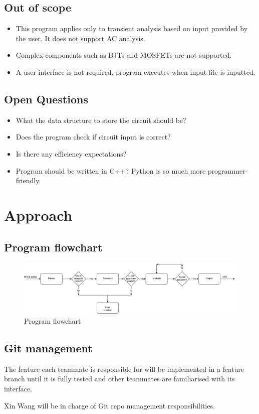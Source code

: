 \documentclass[a4paper, titlepage]{article}
\begin{document}
    \subsection{Out of scope}
    \begin{itemize}
        \item This program applies only to transient analysis based on input provided by the user.
        It does not support AC analysis.
        \item Complex components such as BJTs and MOSFETs are not supported.
        \item A user interface is not required, program executes when input file is inputted.
    \end{itemize}
    \subsection{Open Questions}
    \begin{itemize}
        \item What the data structure to store the circuit should be?
        \item Does the program check if circuit input is correct?
        \item Is there any efficiency expectations?
        \item Program should be written in C++? Python is so much more programmer-friendly.
    \end{itemize}

    \section{Approach}
    \subsection{Program flowchart}
    \begin{figure}[h]
        \centering
        \includegraphics[width = \textwidth]{Program flow}
        \caption{Program flowchart}
        \label{fig:Netlist input example}
    \end{figure}
    \subsection{Git management}
    The feature each teammate is responsible for will be implemented in a feature branch until it is fully tested and
    other teammates are familiarised with its interface. \par
    Xin Wang will be in charge of Git repo management responsibilities.
\end{document}
